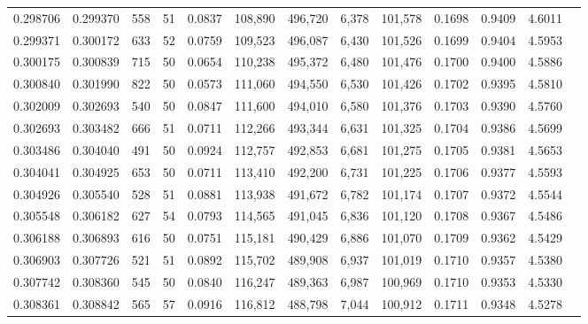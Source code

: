 \begin{tabular}{rrrrrrrrrrrrr}
0.298706 & 0.299370 &   558 &  51 &                                     0.0837 & 108,890 & 496,720 &   6,378 & 101,578 & 0.1698 & 0.9409 & 4.6011 \\
0.299371 & 0.300172 &   633 &  52 &                                     0.0759 & 109,523 & 496,087 &   6,430 & 101,526 & 0.1699 & 0.9404 & 4.5953 \\
0.300175 & 0.300839 &   715 &  50 &                                     0.0654 & 110,238 & 495,372 &   6,480 & 101,476 & 0.1700 & 0.9400 & 4.5886 \\
0.300840 & 0.301990 &   822 &  50 &                                     0.0573 & 111,060 & 494,550 &   6,530 & 101,426 & 0.1702 & 0.9395 & 4.5810 \\
0.302009 & 0.302693 &   540 &  50 &                                     0.0847 & 111,600 & 494,010 &   6,580 & 101,376 & 0.1703 & 0.9390 & 4.5760 \\
0.302693 & 0.303482 &   666 &  51 &                                     0.0711 & 112,266 & 493,344 &   6,631 & 101,325 & 0.1704 & 0.9386 & 4.5699 \\
0.303486 & 0.304040 &   491 &  50 &                                     0.0924 & 112,757 & 492,853 &   6,681 & 101,275 & 0.1705 & 0.9381 & 4.5653 \\
0.304041 & 0.304925 &   653 &  50 &                                     0.0711 & 113,410 & 492,200 &   6,731 & 101,225 & 0.1706 & 0.9377 & 4.5593 \\
0.304926 & 0.305540 &   528 &  51 &                                     0.0881 & 113,938 & 491,672 &   6,782 & 101,174 & 0.1707 & 0.9372 & 4.5544 \\
0.305548 & 0.306182 &   627 &  54 &                                     0.0793 & 114,565 & 491,045 &   6,836 & 101,120 & 0.1708 & 0.9367 & 4.5486 \\
0.306188 & 0.306893 &   616 &  50 &                                     0.0751 & 115,181 & 490,429 &   6,886 & 101,070 & 0.1709 & 0.9362 & 4.5429 \\
0.306903 & 0.307726 &   521 &  51 &                                     0.0892 & 115,702 & 489,908 &   6,937 & 101,019 & 0.1710 & 0.9357 & 4.5380 \\
0.307742 & 0.308360 &   545 &  50 &                                     0.0840 & 116,247 & 489,363 &   6,987 & 100,969 & 0.1710 & 0.9353 & 4.5330 \\
0.308361 & 0.308842 &   565 &  57 &                                     0.0916 & 116,812 & 488,798 &   7,044 & 100,912 & 0.1711 & 0.9348 & 4.5278 \\

\end{tabular}
